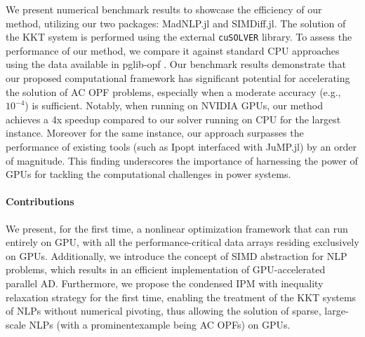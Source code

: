 We present numerical benchmark results to showcase the efficiency of
our method, utilizing our two packages: MadNLP.jl and
SIMDiff.jl. The solution of the KKT system is performed using the
external {\tt cuSOLVER} library. To assess the performance of our method, we
compare it against standard CPU approaches using the data available in
pglib-opf \cite{babaeinejadsarookolaee2019power}.  Our benchmark results
demonstrate that our proposed computational framework has significant
potential for accelerating the solution of AC OPF problems, especially
when a moderate accuracy (e.g., $10^{-4}$) is sufficient.
Notably, when running on NVIDIA GPUs, our method achieves a
4x speedup compared to our solver running on CPU for
the largest instance. Moreover for the same instance, our approach
surpasses the performance of existing tools (such as Ipopt interfaced
with JuMP.jl) by an order of magnitude. This finding underscores the
importance of harnessing the power of GPUs for tackling
the computational challenges in power systems.

\paragraph*{Contributions}
We present, for the first time, a nonlinear optimization framework
that can run entirely on GPU, with all the performance-critical data
arrays residing exclusively on GPUs. Additionally, we introduce the
concept of SIMD abstraction for NLP problems, which results in an
efficient implementation of GPU-accelerated parallel AD. Furthermore,
we propose the condensed IPM with inequality relaxation strategy for
the first time, enabling the treatment of the KKT systems of NLPs
without numerical pivoting, thus allowing the solution of sparse,
large-scale NLPs (with a prominentexample being AC OPFs) on GPUs.

